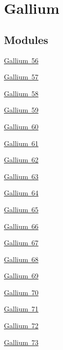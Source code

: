 \hypertarget{group___isotope_const-_gallium}{}\section{Gallium}
\label{group___isotope_const-_gallium}
\subsection*{Modules}
\begin{DoxyCompactItemize}
\item 
\mbox{\hyperlink{group___isotope_const-_gallium-_ga56}{Gallium 56}}
\item 
\mbox{\hyperlink{group___isotope_const-_gallium-_ga57}{Gallium 57}}
\item 
\mbox{\hyperlink{group___isotope_const-_gallium-_ga58}{Gallium 58}}
\item 
\mbox{\hyperlink{group___isotope_const-_gallium-_ga59}{Gallium 59}}
\item 
\mbox{\hyperlink{group___isotope_const-_gallium-_ga60}{Gallium 60}}
\item 
\mbox{\hyperlink{group___isotope_const-_gallium-_ga61}{Gallium 61}}
\item 
\mbox{\hyperlink{group___isotope_const-_gallium-_ga62}{Gallium 62}}
\item 
\mbox{\hyperlink{group___isotope_const-_gallium-_ga63}{Gallium 63}}
\item 
\mbox{\hyperlink{group___isotope_const-_gallium-_ga64}{Gallium 64}}
\item 
\mbox{\hyperlink{group___isotope_const-_gallium-_ga65}{Gallium 65}}
\item 
\mbox{\hyperlink{group___isotope_const-_gallium-_ga66}{Gallium 66}}
\item 
\mbox{\hyperlink{group___isotope_const-_gallium-_ga67}{Gallium 67}}
\item 
\mbox{\hyperlink{group___isotope_const-_gallium-_ga68}{Gallium 68}}
\item 
\mbox{\hyperlink{group___isotope_const-_gallium-_ga69}{Gallium 69}}
\item 
\mbox{\hyperlink{group___isotope_const-_gallium-_ga70}{Gallium 70}}
\item 
\mbox{\hyperlink{group___isotope_const-_gallium-_ga71}{Gallium 71}}
\item 
\mbox{\hyperlink{group___isotope_const-_gallium-_ga72}{Gallium 72}}
\item 
\mbox{\hyperlink{group___isotope_const-_gallium-_ga73}{Gallium 73}}

\end{DoxyCompactItemize}
